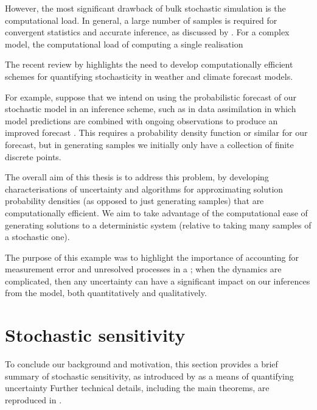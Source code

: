However, the most significant drawback of bulk stochastic simulation is the computational load.
In general, a large number of samples is required for convergent statistics and accurate inference, as discussed by \citet{Leutbecher_2019_EnsembleSizeHow}.
For a complex model, the computational load of computing a single realisation

The recent review by \citet{LeutbecherEtAl_2017_StochasticRepresentationsModel} highlights the need to develop computationally efficient schemes for quantifying stochasticity in weather and climate forecast models.


For example, suppose that we intend on using the probabilistic forecast of our stochastic model in an inference scheme, such as in data assimilation in which model predictions are combined with ongoing observations to produce an improved forecast \cite[e.g.]{LawEtAl_2015_DataAssimilationMathematical,BudhirajaEtAl_2019_AssimilatingDataModels, ReichCotter_2015_ProbabilisticForecastingBayesian}.
This requires a probability density function or similar for our forecast, but in generating samples we initially only have a collection of finite discrete points.


The overall aim of this thesis is to address this problem, by developing characterisations of uncertainty and algorithms for approximating solution probability densities (as opposed to just generating samples) that are computationally efficient.
We aim to take advantage of the computational ease of generating solutions to a deterministic system (relative to taking many samples of a stochastic one).


The purpose of this example was to highlight the importance of accounting for measurement error and unresolved processes in a ; when the dynamics are complicated, then any uncertainty can have a significant impact on our inferences from the model, both quantitatively and qualitatively.



\section{Stochastic sensitivity}\label{sec:s2_summ}
To conclude our background and motivation, this section provides a brief summary of stochastic sensitivity, as introduced by \citet{Balasuriya_2020_StochasticSensitivityComputable} as a means of quantifying uncertainty
Further technical details, including the main theorems, are reproduced in .

